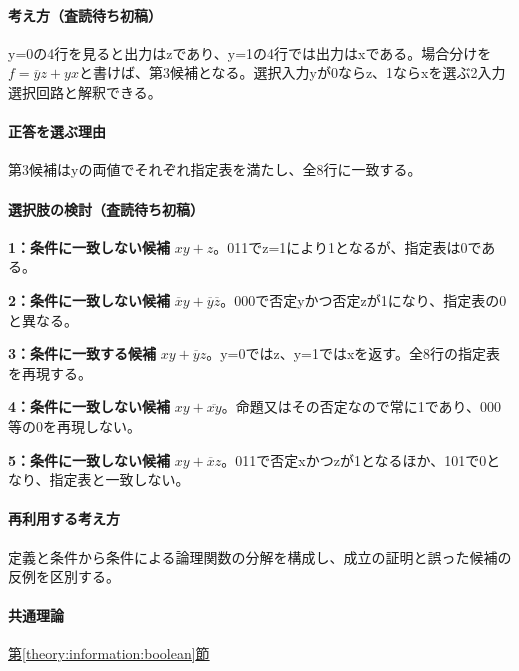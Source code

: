 \paragraph{考え方（査読待ち初稿）} y=\allowbreak{}0の4行を見ると出力はzであり、y=\allowbreak{}1の4行では出力はxである。場合分けを\(f=\overline y z+yx\)と書けば、第3候補となる。選択入力yが0ならz、1ならxを選ぶ2入力選択回路と解釈できる。

\paragraph{正答を選ぶ理由} 第3候補はyの両値でそれぞれ指定表を満たし、全8行に一致する。

\paragraph{選択肢の検討（査読待ち初稿）}\mbox{}\par

\noindent\textbf{1：条件に一致しない候補} \(xy+z\)。011でz=\allowbreak{}1により1となるが、指定表は0である。\par

\noindent\textbf{2：条件に一致しない候補} \(\overline x y+\overline y\overline z\)。000で否定yかつ否定zが1になり、指定表の0と異なる。\par

\noindent\textbf{3：条件に一致する候補} \(xy+\overline y z\)。y=\allowbreak{}0ではz、y=\allowbreak{}1ではxを返す。全8行の指定表を再現する。\par

\noindent\textbf{4：条件に一致しない候補} \(xy+\overline{xy}\)。命題又はその否定なので常に1であり、000等の0を再現しない。\par

\noindent\textbf{5：条件に一致しない候補} \(xy+\overline x z\)。011で否定xかつzが1となるほか、101で0となり、指定表と一致しない。\par

\paragraph{再利用する考え方} 定義と条件から条件による論理関数の分解を構成し、成立の証明と誤った候補の反例を区別する。

\paragraph{共通理論} \hyperref[theory:information:boolean]{第\ref*{theory:information:boolean}節}

